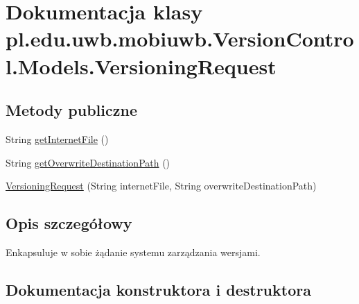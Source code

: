 \hypertarget{classpl_1_1edu_1_1uwb_1_1mobiuwb_1_1_version_control_1_1_models_1_1_versioning_request}{}\section{Dokumentacja klasy pl.\+edu.\+uwb.\+mobiuwb.\+Version\+Control.\+Models.\+Versioning\+Request}
\label{classpl_1_1edu_1_1uwb_1_1mobiuwb_1_1_version_control_1_1_models_1_1_versioning_request}
\subsection*{Metody publiczne}
\begin{DoxyCompactItemize}
\item 
String \hyperlink{classpl_1_1edu_1_1uwb_1_1mobiuwb_1_1_version_control_1_1_models_1_1_versioning_request_a814c846f27bb6227b13524593a259c8e}{get\+Internet\+File} ()
\item 
String \hyperlink{classpl_1_1edu_1_1uwb_1_1mobiuwb_1_1_version_control_1_1_models_1_1_versioning_request_a3ee32c67109e818d69db27b917c2ec3e}{get\+Overwrite\+Destination\+Path} ()
\item 
\hyperlink{classpl_1_1edu_1_1uwb_1_1mobiuwb_1_1_version_control_1_1_models_1_1_versioning_request_ae89fd9fea6d596f4aa591e8f8a0c6bb9}{Versioning\+Request} (String internet\+File, String overwrite\+Destination\+Path)
\end{DoxyCompactItemize}


\subsection{Opis szczegółowy}
Enkapsuluje w sobie żądanie systemu zarządzania wersjami. 

\subsection{Dokumentacja konstruktora i destruktora}
\hypertarget{classpl_1_1edu_1_1uwb_1_1mobiuwb_1_1_version_control_1_1_models_1_1_versioning_request_ae89fd9fea6d596f4aa591e8f8a0c6bb9}{}
